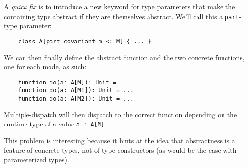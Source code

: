 A \textit{quick fix} is to introduce a new keyword for type parameters that make the containing type abstract if they are themselves abstract. We'll call this a \texttt{part}-type parameter:

\begin{lstlisting}
    class A[part covariant m <: M] { ... }
\end{lstlisting}

We can then finally define the abstract function and the two concrete functions, one for each mode, as such:

\begin{lstlisting}
    function do(a: A[M]): Unit = ...
    function do(a: A[M1]): Unit = ...
    function do(a: A[M2]): Unit = ...
\end{lstlisting}

Multiple-dispatch will then dispatch to the correct function depending on the runtime type of a value \texttt{a : A[M]}.

This problem is interesting because it hints at the idea that abstractness is a feature of concrete types, not of type constructors (as would be the case with parameterized types).






